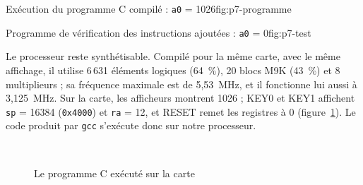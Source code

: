 {Exécution du programme C compilé : \texttt{a0} = 1026}{fig:p7-programme}

{Programme de vérification des instructions ajoutées : \texttt{a0} = 0}{fig:p7-test}

Le processeur reste synthétisable. Compilé pour la même carte, avec le même affichage, il
utilise 6\,631 éléments logiques (64~\%), 20 blocs M9K (43~\%) et 8 multiplieurs ; sa
fréquence maximale est de 5,53~MHz, et il fonctionne lui aussi à 3,125~MHz. Sur la carte, les
afficheurs montrent 1026 ; KEY0 et KEY1 affichent \texttt{sp} = 16384 (\texttt{0x4000}) et
\texttt{ra} = 12, et RESET remet les registres à 0 (figure~\ref{fig:p7-carte}). Le code
produit par \texttt{gcc} s'exécute donc sur notre processeur.

\begin{figure}[H]
\centering
{}\hfill
{}\\[3mm]
\hfill
{}
\caption{Le programme C exécuté sur la carte}
\label{fig:p7-carte}
\end{figure}
